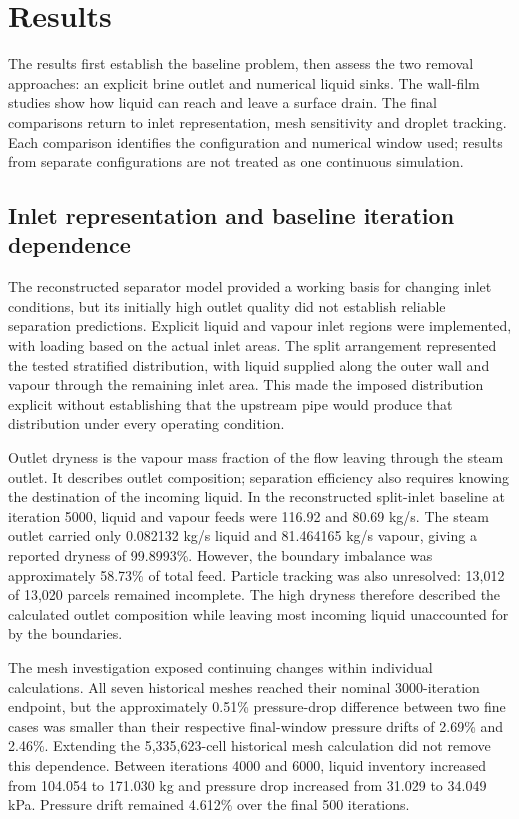 \section{Results}

The results first establish the baseline problem, then assess the two removal approaches: an explicit brine outlet and numerical liquid sinks. The wall-film studies show how liquid can reach and leave a surface drain. The final comparisons return to inlet representation, mesh sensitivity and droplet tracking. Each comparison identifies the configuration and numerical window used; results from separate configurations are not treated as one continuous simulation.

\subsection{Inlet representation and baseline iteration dependence}

The reconstructed separator model provided a working basis for changing inlet conditions, but its initially high outlet quality did not establish reliable separation predictions. Explicit liquid and vapour inlet regions were implemented, with loading based on the actual inlet areas. The split arrangement represented the tested stratified distribution, with liquid supplied along the outer wall and vapour through the remaining inlet area. This made the imposed distribution explicit without establishing that the upstream pipe would produce that distribution under every operating condition.

Outlet dryness is the vapour mass fraction of the flow leaving through the steam outlet. It describes outlet composition; separation efficiency also requires knowing the destination of the incoming liquid. In the reconstructed split-inlet baseline at iteration 5000, liquid and vapour feeds were 116.92 and 80.69 kg/s. The steam outlet carried only 0.082132 kg/s liquid and 81.464165 kg/s vapour, giving a reported dryness of 99.8993\%. However, the boundary imbalance was approximately 58.73\% of total feed. Particle tracking was also unresolved: 13,012 of 13,020 parcels remained incomplete. The high dryness therefore described the calculated outlet composition while leaving most incoming liquid unaccounted for by the boundaries.

The mesh investigation exposed continuing changes within individual calculations. All seven historical meshes reached their nominal 3000-iteration endpoint, but the approximately 0.51\% pressure-drop difference between two fine cases was smaller than their respective final-window pressure drifts of 2.69\% and 2.46\%. Extending the 5,335,623-cell historical mesh calculation did not remove this dependence. Between iterations 4000 and 6000, liquid inventory increased from 104.054 to 171.030 kg and pressure drop increased from 31.029 to 34.049 kPa. Pressure drift remained 4.612\% over the final 500 iterations.

